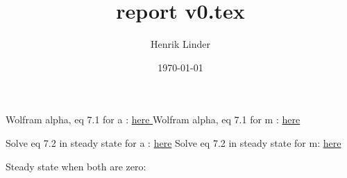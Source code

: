 \documentclass{article}
\title{report v0.tex }
\author{Henrik Linder}
\date{\today}
\begin{document}
\maketitle

Wolfram alpha, eq 7.1 for a  : \href{https://www.wolframalpha.com/input?i=solve+0+\%3D+alpha*\%28a*\%281-a-m\%29+-+a*m\%29+\%2B+\%281+-+alpha\%29*\%28\%281-a-m\%29\%2F2+-+a\%29+for+a+}{here }
Wolfram alpha, eq 7.1 for m  : \href{https://www.wolframalpha.com/input?i=solve+0+%3D+alpha*%28a*%281-a-m%29+-+a*m%29+%2B+%281+-+alpha%29*%28%281-a-m%29%2F2+-+a%29+for+m}{here }

Solve eq 7.2 in steady state for a : \href{https://www.wolframalpha.com/input?i=solve+0+\%3D+alpha*\%28m*\%281-a-m\%29+-+a*m\%29+\%2B+\%281+-+alpha\%29*\%28\%281-a-m\%29\%2F2+-+a\%29+for+a+}{here}
Solve eq 7.2 in steady state for m: \href{https://www.wolframalpha.com/input?i=solve+0+%3D+alpha*%28m*%281-a-m%29+-+a*m%29+%2B+%281+-+alpha%29*%28%281-a-m%29%2F2+-+a%29+for+m}{here}




Steady state when both are zero: 
\end{document}
